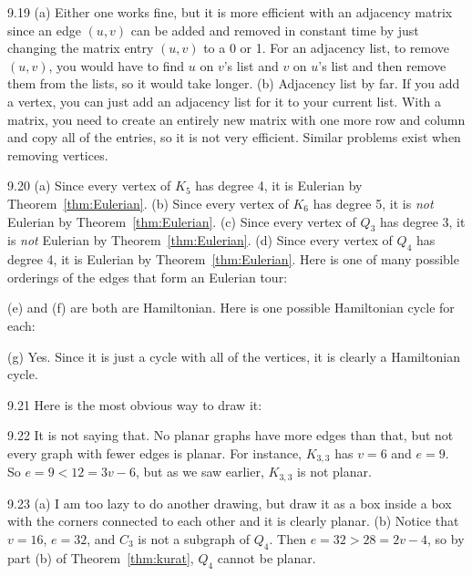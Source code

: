 \begin{RequAnswer}{9.19}
(a) Either one works fine, but it is more efficient with an adjacency matrix since an edge $(u,v)$ can be added and removed in
constant time by just changing the matrix entry $(u,v)$ to a 0 or 1.
For an adjacency list, to remove $(u,v)$, you would have to find $u$ on $v$'s list and $v$ on $u$'s list and then remove them from the lists, so it would take longer.
(b) Adjacency list by far. If you add a vertex, you can just add an adjacency list for it to your current list. With a matrix,
you need to create an entirely new matrix with one more row and column and copy all of the entries, so it is not very efficient.
Similar problems exist when removing vertices.
\end{RequAnswer}
\begin{RequAnswer}{9.20}
(a) Since every vertex of $K_5$ has degree 4, it is Eulerian by Theorem~\ref{thm:Eulerian}.
(b) Since every vertex of $K_6$ has degree 5, it is {\em not} Eulerian by Theorem~\ref{thm:Eulerian}.
(c) Since every vertex of $Q_3$ has degree 3, it is {\em not} Eulerian by Theorem~\ref{thm:Eulerian}.
(d) Since every vertex of $Q_4$ has degree 4, it is Eulerian by Theorem~\ref{thm:Eulerian}.
Here is one of many possible orderings of the edges that form an Eulerian tour:


\noindent
(e) and (f) are both are Hamiltonian. Here is one possible Hamiltonian cycle for each:


\noindent
(g) Yes. Since it is just a cycle with all of the vertices, it is clearly a Hamiltonian cycle.
\end{RequAnswer}
\begin{RequAnswer}{9.21}
Here is the most obvious way to draw it:

\end{RequAnswer}
\begin{RequAnswer}{9.22}
It is not saying that. No planar graphs have more edges than that, but not every graph with fewer edges is planar.
For instance, $K_{3,3}$ has $v=6$ and $e=9$. So $e=9<12=3v-6$, but as we saw earlier, $K_{3,3}$ is not planar.
\end{RequAnswer}
\begin{RequAnswer}{9.23}
(a) I am too lazy to do another drawing, but draw it as a box inside a box with the corners connected to each other and it is clearly planar.
(b) Notice that $v=16$, $e=32$, and $C_3$ is not a subgraph of $Q_4$. Then $e=32>28=2v-4$, so by part (b) of
Theorem~\ref{thm:kurat}, $Q_4$ cannot be planar.
\end{RequAnswer}
